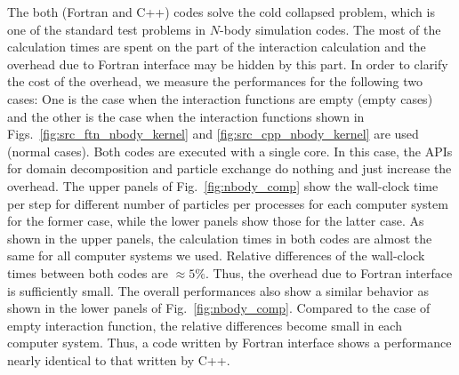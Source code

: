 \documentclass[twocolumn,useamsfonts]{pasj01}
\begin{document}
The both (Fortran and C++) codes solve the cold collapsed problem, which is one of the standard test problems in $N$-body simulation codes. The most of the calculation times are spent on the part of the interaction calculation and the overhead due to Fortran interface may be hidden by this part. In order to clarify the cost of the overhead, we measure the performances for the following two cases: One is the case when the interaction functions are empty (empty cases) and the other is the case when the interaction functions shown in Figs.~\ref{fig:src_ftn_nbody_kernel} and \ref{fig:src_cpp_nbody_kernel} are used (normal cases). Both codes are executed with a single core. In this case, the APIs for domain decomposition and particle exchange do nothing and just increase the overhead. The upper panels of Fig.~\ref{fig:nbody_comp} show the wall-clock time per step for different number of particles per processes for each computer system for the former case, while the lower panels show those for the latter case. As shown in the upper panels, the calculation times in both codes are almost the same for all computer systems we used. Relative differences of the wall-clock times between both codes are $\approx 5\%$. Thus, the overhead due to Fortran interface is sufficiently small. The overall performances also show a similar behavior as shown in the lower panels of Fig.~\ref{fig:nbody_comp}. Compared to the case of empty interaction function, the relative differences become small in each computer system. Thus, a code written by Fortran interface shows a performance nearly identical to that written by C++.
\end{document}
